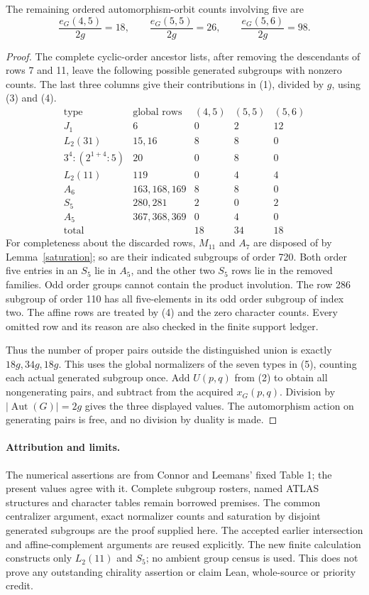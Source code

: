 \documentclass[11pt,a4paper]{article}
\begin{document}
\begin{theorem}
The remaining ordered automorphism-orbit counts involving five are
\[
 \frac{e_G(4,5)}{2g}=18,\qquad
 \frac{e_G(5,5)}{2g}=26,\qquad
 \frac{e_G(5,6)}{2g}=98.
\]
\end{theorem}
\begin{proof}
The complete cyclic-order ancestor lists, after removing the
descendants of rows 7 and 11, leave the following possible
generated subgroups with nonzero counts. The last three columns
give their contributions in (1), divided by $g$, using (3) and (4).
\[
\begin{array}{c|c|rrr}
\text{type}&\text{global rows}&(4,5)&(5,5)&(5,6)\\\hline
J_1&6&0&2&12\\
L_2(31)&15,16&8&8&0\\
3^4:(2^{1+4}:5)&20&0&8&0\\
L_2(11)&119&0&4&4\\
A_6&163,168,169&8&8&0\\
S_5&280,281&2&0&2\\
A_5&367,368,369&0&4&0\\\hline
\text{total}&&18&34&18
\end{array}
\tag{5}
\]
For completeness about the discarded rows, $M_{11}$ and $A_7$
are disposed of by Lemma~\ref{saturation}; so are their indicated
subgroups of order 720. Both order five entries in an $S_5$ lie
in $A_5$, and the other two $S_5$ rows lie in the removed families.
Odd order groups cannot contain the product involution. The row
286 subgroup of order 110 has all five-elements in its odd order
subgroup of index two. The affine rows are treated by (4) and
the zero character counts. Every omitted row and its reason are
also checked in the finite support ledger.

Thus the number of proper pairs outside the distinguished union
is exactly $18g,34g,18g$. This uses the global normalizers of
the seven types in (5), counting each actual generated subgroup
once. Add $U(p,q)$ from (2) to obtain all nongenerating pairs,
and subtract from the acquired $x_G(p,q)$. Division by
$|\operatorname{Aut}(G)|=2g$ gives the three displayed values.
The automorphism action on generating pairs is free, and no
division by duality is made.
\end{proof}

\paragraph{Attribution and limits.}
The numerical assertions are from Connor and Leemans' fixed
Table 1; the present values agree with it. Complete subgroup
rosters, named ATLAS structures and character tables remain
borrowed premises. The common centralizer argument, exact
normalizer counts and saturation by disjoint generated subgroups
are the proof supplied here. The accepted earlier intersection
and affine-complement arguments are reused explicitly. The new
finite calculation constructs only $L_2(11)$ and $S_5$; no ambient
group census is used. This does not prove any outstanding
chirality assertion or claim Lean, whole-source or priority credit.
\end{document}
